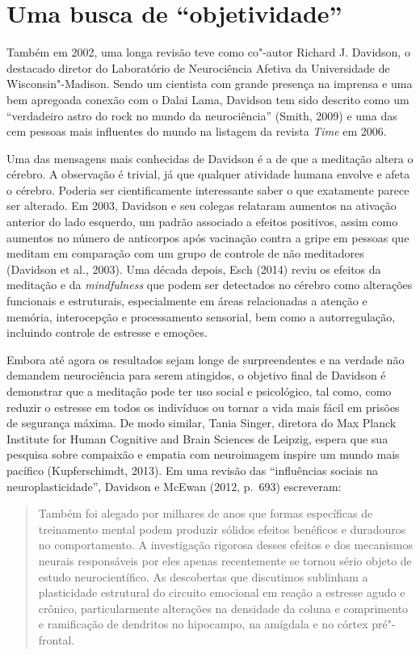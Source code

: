 \section{Uma busca de ``objetividade''}

Também em 2002, uma longa revisão teve como co"-autor Richard J.
Davidson, o destacado diretor do Laboratório de Neurociência Afetiva da
Universidade de Wisconsin"-Madison. Sendo um cientista com grande
presença na imprensa e uma bem apregoada conexão com o Dalai Lama,
Davidson tem sido descrito como um ``verdadeiro astro do rock no mundo
da neurociência'' (Smith, 2009) e uma das cem pessoas mais influentes do
mundo na listagem da revista \emph{Time} em 2006.

Uma das mensagens mais conhecidas de Davidson é a de que a meditação
altera o cérebro. A observação é trivial, já que qualquer atividade
humana envolve e afeta o cérebro. Poderia ser cientificamente
interessante saber o que exatamente parece ser alterado. Em 2003,
Davidson e seu colegas relataram aumentos na ativação anterior do lado
esquerdo, um padrão associado a efeitos positivos, assim como aumentos
no número de anticorpos após vacinação contra a gripe em pessoas que
meditam em comparação com um grupo de controle de não meditadores
(Davidson et al., 2003). Uma década depois, Esch (2014) reviu os efeitos
da meditação e da \emph{mindfulness} que podem ser detectados no cérebro
como alterações funcionais e estruturais, especialmente em áreas
relacionadas a atenção e memória, interocepção e processamento
sensorial, bem como a autorregulação, incluindo controle de estresse e
emoções.

Embora até agora os resultados sejam longe de surpreendentes e na
verdade não demandem neurociência para serem atingidos, o objetivo final
de Davidson é demonstrar que a meditação pode ter uso social e
psicológico, tal como, como reduzir o estresse em todos os indivíduos ou
tornar a vida mais fácil em prisões de segurança máxima. De modo
similar, Tania Singer, diretora do Max Planck Institute for Human
Cognitive and Brain Sciences de Leipzig, espera que sua pesquisa sobre
compaixão e empatia com neuroimagem inspire um mundo mais pacífico
(Kupferschimdt, 2013). Em uma revisão das ``influências sociais na
neuroplasticidade'', Davidson e McEwan (2012, p.~693) escreveram:

\begin{quote}
Também foi alegado por milhares de anos que formas específicas de
treinamento mental podem produzir sólidos efeitos benéficos e duradouros
no comportamento. A investigação rigorosa desses efeitos e dos
mecanismos neurais responsáveis por eles apenas recentemente se tornou
sério objeto de estudo neurocientífico. As descobertas que discutimos
sublinham a plasticidade estrutural do circuito emocional em reação a
estresse agudo e crônico, particularmente alterações na densidade da
coluna e comprimento e ramificação de dendritos no hipocampo, na
amígdala e no córtex pré"-frontal.
\end{quote}

